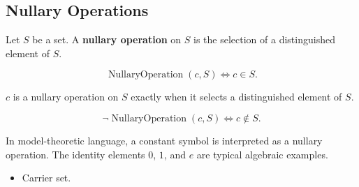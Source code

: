 \subsection{Nullary Operations}
\label{subsec:nullary-operations}

\begin{definition}
\label{def:nullary-operation}
Let $S$ be a set.
A \textbf{nullary operation} on $S$ is the selection of a distinguished element
of $S$.
\end{definition}

\begin{remark*}
\[
\operatorname{NullaryOperation}(c,S)
\Longleftrightarrow
c\in S.
\]
\end{remark*}

\begin{remark*}
$c$ is a nullary operation on $S$ exactly when it selects a distinguished
element of $S$.
\end{remark*}

\begin{remark*}
\[
\neg\operatorname{NullaryOperation}(c,S)
\Longleftrightarrow
c\notin S.
\]
\end{remark*}

\begin{remark*}[Interpretation]
In model-theoretic language, a constant symbol is interpreted as a nullary
operation.  The identity elements $0$, $1$, and $e$ are typical algebraic
examples.
\end{remark*}

\begin{remark*}[Dependencies]
\begin{itemize}
  \item Carrier set.
\end{itemize}
\end{remark*}
